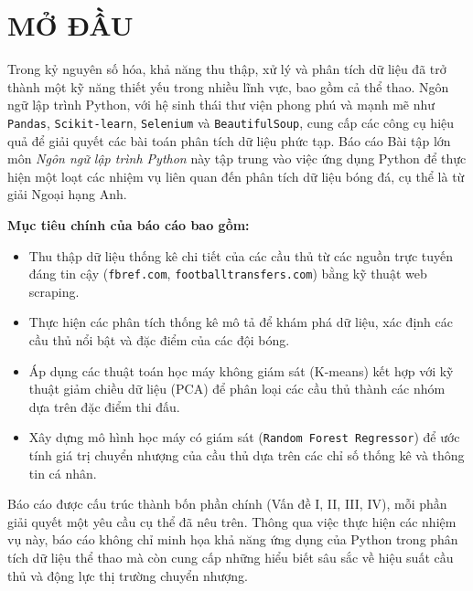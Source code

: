 \documentclass[12pt]{report}
\begin{document}
\chapter*{MỞ ĐẦU}
{
\noindent
Trong kỷ nguyên số hóa, khả năng thu thập, xử lý và phân tích dữ liệu đã trở thành một kỹ năng thiết yếu trong nhiều lĩnh vực, bao gồm cả thể thao. Ngôn ngữ lập trình Python, với hệ sinh thái thư viện phong phú và mạnh mẽ như \texttt{Pandas}, \texttt{Scikit-learn}, \texttt{Selenium} và \texttt{BeautifulSoup}, cung cấp các công cụ hiệu quả để giải quyết các bài toán phân tích dữ liệu phức tạp. Báo cáo Bài tập lớn môn \textit{Ngôn ngữ lập trình Python} này tập trung vào việc ứng dụng Python để thực hiện một loạt các nhiệm vụ liên quan đến phân tích dữ liệu bóng đá, cụ thể là từ giải Ngoại hạng Anh.

\vspace{1em}
\noindent
\textbf{Mục tiêu chính của báo cáo bao gồm:}
\begin{itemize}
  \item Thu thập dữ liệu thống kê chi tiết của các cầu thủ từ các nguồn trực tuyến đáng tin cậy (\texttt{fbref.com}, \texttt{footballtransfers.com}) bằng kỹ thuật web scraping.
  \item Thực hiện các phân tích thống kê mô tả để khám phá dữ liệu, xác định các cầu thủ nổi bật và đặc điểm của các đội bóng.
  \item Áp dụng các thuật toán học máy không giám sát (K-means) kết hợp với kỹ thuật giảm chiều dữ liệu (PCA) để phân loại các cầu thủ thành các nhóm dựa trên đặc điểm thi đấu.
  \item Xây dựng mô hình học máy có giám sát (\texttt{Random Forest Regressor}) để ước tính giá trị chuyển nhượng của cầu thủ dựa trên các chỉ số thống kê và thông tin cá nhân.
\end{itemize}

\vspace{0.5em}
\noindent
Báo cáo được cấu trúc thành bốn phần chính (Vấn đề I, II, III, IV), mỗi phần giải quyết một yêu cầu cụ thể đã nêu trên. Thông qua việc thực hiện các nhiệm vụ này, báo cáo không chỉ minh họa khả năng ứng dụng của Python trong phân tích dữ liệu thể thao mà còn cung cấp những hiểu biết sâu sắc về hiệu suất cầu thủ và động lực thị trường chuyển nhượng.

}
\end{document}
